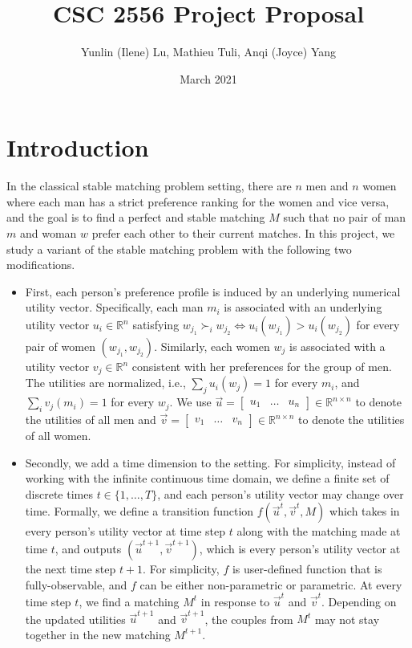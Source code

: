 \documentclass{article}
\title{CSC 2556 Project Proposal}
\author{Yunlin (Ilene) Lu, Mathieu Tuli, Anqi (Joyce) Yang}
\date{March 2021}
\begin{document}
\maketitle

\section{Introduction}
In the classical stable matching problem setting, there are $n$ men and $n$ women where each man has a strict preference ranking for the women and vice versa, and the goal is to find a perfect and stable matching $M$ such that no pair of man $m$ and woman $w$ prefer each other to their current matches. In this project, we study a variant of the stable matching problem with the following two modifications.
\begin{itemize}
    \item First, each person's preference profile is induced by an underlying numerical utility vector. Specifically, each man $m_i$ is associated with an underlying utility vector $u_i \in \mathbb{R}^n$ satisfying $w_{j_1} \succ_i w_{j_2} \Leftrightarrow u_i(w_{j_1}) > u_i(w_{j_2})$ for every pair of women $(w_{j_1}, w_{j_2})$. Similarly, each women $w_j$ is associated with a utility vector $v_j \in \mathbb{R}^n$ consistent with her preferences for the group of men. The utilities are normalized, i.e., $\sum_{j}{u_i(w_j)} = 1$ for every $m_i$, and $\sum_{i}{v_j(m_i)} = 1$ for every $w_j$. We use $\overrightarrow{u} = \begin{bmatrix} u_1 & \ldots & u_n\end{bmatrix} \in \mathbb{R}^{n\times n}$ to denote the utilities of all men and $\overrightarrow{v}=\begin{bmatrix} v_1 & \ldots & v_n\end{bmatrix}\in \mathbb{R}^{n\times n}$ to denote the utilities of all women.
    \item Secondly, we add a time dimension to the setting. For simplicity, instead of working with the infinite continuous time domain, we define a finite set of discrete times $t \in \{1, \ldots, T\}$, and each person's utility vector may change over time. Formally, we define a transition function $f(\overrightarrow{u}^t, \overrightarrow{v}^t, M)$ which takes in every person's utility vector at time step $t$ along with the matching made at time $t$, and outputs $(\overrightarrow{u}^{t+1}, \overrightarrow{v}^{t+1})$, which is every person's utility vector at the next time step $t+1$. For simplicity, $f$ is user-defined function that is fully-observable, and $f$ can be either non-parametric or parametric. At every time step $t$, we find a matching $M^{t}$ in response to $\overrightarrow{u}^t$ and $\overrightarrow{v}^t$. Depending on the updated utilities $\overrightarrow{u}^{t+1}$ and $\overrightarrow{v}^{t+1}$, the couples from $M^t$ may not stay together in the new matching $M^{t+1}$.
\end{itemize}
\end{document}
